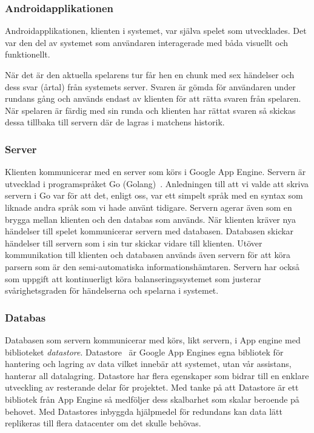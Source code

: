 \documentclass[a4paper, 11pt]{article}
\begin{document}
\subsubsection{Androidapplikationen}
Androidapplikationen, klienten i systemet, var själva spelet som utvecklades. Det var den del av systemet som användaren interagerade med båda visuellt och funktionellt.

När det är den aktuella spelarens tur får hen en chunk med sex händelser och dess svar (årtal) från systemets server. Svaren är gömda för användaren under rundans gång och används endast av klienten för att rätta svaren från spelaren. När spelaren är färdig med sin runda och klienten har rättat svaren så skickas dessa tillbaka till servern där de lagras i matchens historik. 

\subsubsection{Server}
Klienten kommunicerar med en server som körs i Google App Engine. Servern är utvecklad i programspråket Go (Golang)~\cite{golang}. Anledningen till att vi valde att skriva servern i Go var för att det, enligt oss, var ett simpelt språk med en syntax som liknade andra språk som vi hade använt tidigare. Servern agerar även som en brygga mellan klienten och den databas som används. När klienten kräver nya händelser till spelet kommunicerar servern med databasen. Databasen skickar händelser till servern som i sin tur skickar vidare till klienten. Utöver kommunikation till klienten och databasen används även servern för att köra parsern som är den semi-automatiska informationshämtaren. Servern har också som uppgift att kontinuerligt köra balanseringssystemet som justerar svårighetsgraden för händelserna och spelarna i systemet. 

\subsubsection{Databas}
Databasen som servern kommunicerar med körs, likt servern, i App engine med biblioteket \textit{datastore}. Datastore~\cite{datastore} är Google App Engines egna bibliotek för hantering och lagring av data vilket innebär att systemet, utan vår assistans, hanterar all datalagring. Datastore har flera egenskaper som bidrar till en enklare utveckling av resterande delar för projektet. Med tanke på att Datastore är ett bibliotek från App Engine så medföljer dess skalbarhet som skalar beroende på behovet. Med Datastores inbyggda hjälpmedel för redundans kan data lätt replikeras till flera datacenter om det skulle behövas.
\end{document}
